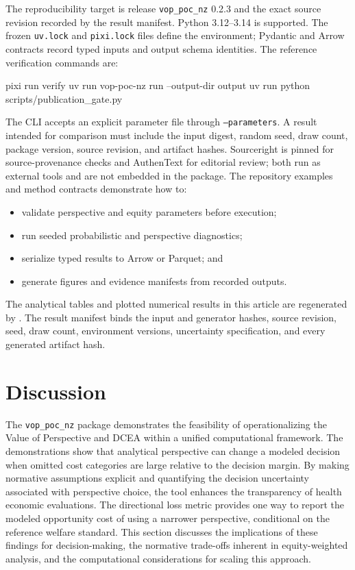\documentclass[article]{jss}
\newcommand{\pkg}[1]{\texttt{#1}}
\newcommand{\code}[1]{\texttt{#1}}
\begin{document}
The reproducibility target is release \pkg{vop\_poc\_nz} 0.2.3 and the exact
source revision recorded by the result manifest. Python 3.12--3.14 is
supported. The frozen \code{uv.lock} and \code{pixi.lock} files define the
environment; Pydantic and Arrow contracts record typed inputs and output
schema identities. The reference verification commands are:
\begin{CodeInput}
pixi run verify
uv run vop-poc-nz run --output-dir output
uv run python scripts/publication_gate.py
\end{CodeInput}
The CLI accepts an explicit parameter file through \code{--parameters}. A
result intended for comparison must include the input digest, random seed,
draw count, package version, source revision, and artifact hashes. Sourceright
is pinned for source-provenance checks and AuthenText for editorial review;
both run as external tools and are not embedded in the package.
The repository examples and method contracts demonstrate how to:
\begin{itemize}
    \item validate perspective and equity parameters before execution;
    \item run seeded probabilistic and perspective diagnostics;
    \item serialize typed results to Arrow or Parquet; and
    \item generate figures and evidence manifests from recorded outputs.
\end{itemize}
The analytical tables and plotted numerical results in this article are
regenerated by . The result
manifest binds the input and generator hashes, source revision, seed, draw
count, environment versions, uncertainty specification, and every generated
artifact hash.

\section{Discussion} \label{sec:discussion}

The \pkg{vop\_poc\_nz} package demonstrates the feasibility of operationalizing the Value of Perspective and DCEA within a unified computational framework.
The demonstrations show that analytical perspective can change a modeled decision when omitted cost categories are large relative to the decision margin.
By making normative assumptions explicit and quantifying the decision uncertainty associated with perspective choice, the tool enhances the transparency of health economic evaluations.
The directional loss metric provides one way to report the modeled opportunity cost of using a narrower perspective, conditional on the reference welfare standard.
This section discusses the implications of these findings for decision-making, the normative trade-offs inherent in equity-weighted analysis, and the computational considerations for scaling this approach.
\end{document}
